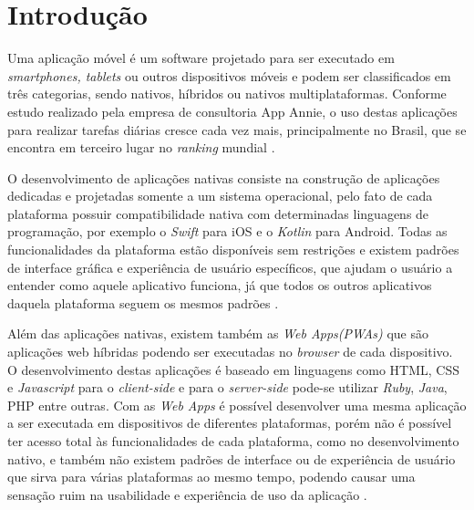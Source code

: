\chapter{Introdução}
\label{cap1}

\vspace{-1.9cm}


    Uma aplicação móvel é um software projetado para ser executado em \textit{smartphones, tablets} ou outros dispositivos móveis e podem ser classificados em três categorias, sendo nativos, híbridos ou nativos multiplataformas. Conforme estudo realizado pela empresa de consultoria App Annie, o uso destas aplicações para realizar tarefas diárias cresce cada vez mais, principalmente no Brasil, que se encontra em terceiro lugar no \textit{ranking} mundial \cite{AppAnnie2020}.

    O desenvolvimento de aplicações nativas consiste na construção de aplicações dedicadas e projetadas somente a um sistema operacional,  pelo fato de cada plataforma possuir compatibilidade nativa com determinadas linguagens de programação, por exemplo o \textit{Swift} para iOS e o \textit{Kotlin} para Android. Todas as funcionalidades da plataforma estão disponíveis sem restrições e existem padrões de interface gráfica e experiência de usuário específicos, que ajudam o usuário a entender como aquele aplicativo funciona, já que todos os outros aplicativos daquela plataforma seguem os mesmos padrões \cite{Corral2012}.
    
    Além das aplicações nativas, existem também as \textit{Web Apps(PWAs)} que são aplicações web híbridas podendo ser executadas no \textit{browser} de cada dispositivo. O desenvolvimento destas aplicações é baseado em linguagens como HTML, CSS e \textit{Javascript} para o \textit{client-side} e para o \textit{server-side} pode-se utilizar \textit{Ruby}, \textit{Java}, PHP entre outras. Com as \textit{Web Apps} é possível desenvolver uma mesma aplicação a ser executada em dispositivos de diferentes plataformas, porém não é possível ter acesso total às funcionalidades de cada plataforma, como no desenvolvimento nativo, e também não existem padrões de interface ou de experiência de usuário que sirva para várias plataformas ao mesmo tempo, podendo causar uma sensação ruim na usabilidade e experiência de uso da aplicação \cite{Corral2012}.

